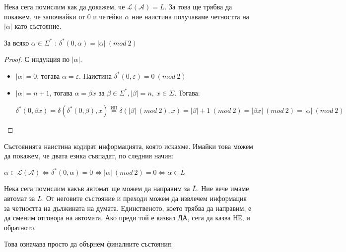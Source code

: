 Нека сега помислим как да докажем, че $\mathcal{L(A)} = L$.
За това ще трябва да покажем, че започвайки от $0$ и четейки $\alpha$ ние наистина получаваме четността на $|\alpha|$ като състояние.

\begin{claim}
    За всяко $\alpha \in \Sigma^*$ : $\delta^*(0, \alpha) = |\alpha| \: (mod \: 2)$
\end{claim}

\begin{proof}
    С индукция по $|\alpha|$.
    \begin{itemize}
        \item $|\alpha| = 0$, тогава $\alpha = \varepsilon$.
              Наистина $\delta^*(0, \varepsilon) = 0 \: (mod \: 2)$ \checkmark
        \item $|\alpha| = n + 1$, тогава $\alpha = \beta x$ за $\beta \in \Sigma^*, |\beta| = n, \: x \in \Sigma$.
              Тогава:
              \begin{center}
                  $\delta^*(0, \beta x) = \delta(\delta^*(0, \beta), x) \stackrel{\text{ИП}}{=} \delta(|\beta| \: (mod \: 2), x) = |\beta| + 1 \: (mod \: 2) = |\beta x| \: (mod \: 2) = |\alpha| \: (mod \: 2)$
              \end{center}
    \end{itemize}
\end{proof}

Състоянията наистина кодират информацията, която искахме.
Имайки това можем да покажем, че двата езика съвпадат, по следния начин:
\begin{center}
    $\alpha \in \mathcal{L(A)} \iff \delta^*(0, \alpha) = 0 \iff |\alpha| \: (mod \: 2) = 0 \iff \alpha \in L$
\end{center}


Нека сега помислим какъв автомат ще можем да направим за $\overline{L}$.
Ние вече имаме автомат за $L$.
От неговите състояние и преходи можем да извлечем информация за четността на дължината на думата.
Единственото, което трябва да направим, е да сменим отговора на автомата.
Ако преди той е казвал ДА, сега да казва НЕ, и обратното.

\pagebreak

Това означава просто да обърнем финалните състояния:
\begin{center}
\end{center}

